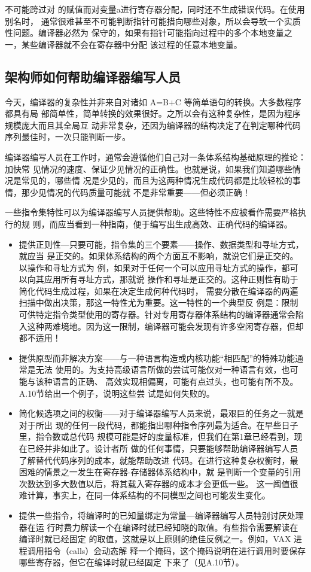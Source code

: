 不可能跨过对 的赋值而对变量a进行寄存器分配，同时还不生成错误代码。在使用别名时，
通常很难甚至不可能判断指针可能措向哪些对象，所以会导致一个实质性问题。编译器必然为
保守的，如果有指针可能指向过程中的多个本地变量之一，某些编译器就不会在寄存器中分配
该过程的任意本地变量。

\subsection{架构师如何帮助编译器编写人员}

今天，编译器的复杂性并非来自对诸如 A=B+C 等简单语句的转换。大多数程序都具有局
部简单性，简单转换的效果很好。之所以会有这种复杂性，是因为程序规模庞大而且其全局互
动非常复杂，还因为编译器的结构决定了在判定哪种代码序列最佳时，一次只能判断一步。

编译器编写人员在工作时，通常会遵循他们自己对一条体系结构基础原理的推论：加快常
见情况的速度、保证少见情况的正确性。也就是说，如果我们知道哪些情况是常见的，哪些情
况是少见的，而且为这两种情况生成代码都是比较轻松的事情，那少见情况的代码质量可能就
不是非常重要——但必须正确！

一些指令集特性可以为编译器编写人员提供帮助。这些特性不应被看作需要严格执行的规
则，而应当看到一种指南，便于编写出生成高效、正确代码的编译器。
\begin{itemize}
    \item 提供正则性—只要可能，指令集的三个要素——操作、数据类型和寻址方式，就应当
    是正交的。如果体系结构的两个方面互不影响，就说它们是正交的。以操作和寻址方式为
    例，如果对于任何一个可以应用寻址方式的操作，都可以向其应用所有寻址方式，那就说
    操作和寻址是正交的。这种正则性有助于简化代码生成过程，如果在决定生成何种代码时，
    需要分散在编译器的两遍扫描中做出决策，那这一特性尤为重要。这一特性的一个典型反
    例是：限制可供特定指令类型使用的寄存器。针对专用寄存器体系结构的编译器通常会陷
    入这种两难境地。因为这一限制，编译器可能会发现有许多空闲寄存器，但却都不适用！
    \item 提供原型而非解决方案——与一种语言构造或内核功能“相匹配”的特殊功能通常是无法
    使用的。为支持高级语言所做的尝试可能仅对一种语言有效，也可能与该种语言的正确、
    高效实现相偏离，可能有点过头，也可能有所不及。A.10节给出一个例子，说明这些尝
    试是如何失败的。
    \item 简化候选项之间的权衡——对于编译器编写人员来说，最艰巨的任务之一就是对于所出
    现的任何一段代码，都能指出哪种指令序列最为适合。在早些日子里，指令数或总代码
    规模可能是好的度量标准，但我们在第1章已经看到，现在已经并非如此了。设计者所
    做的任何事情，只要能够帮助编译器编写人员了解替代代码序列的成本，就能帮助改进
    代码。在进行这种复杂权衡时，最困难的情景之一发生在寄存器-存储器体系结构中，就
    是判断一个变量的引用次数达到多大数值以后，将其载入寄存器的成本才会更低一些。
    这一阈值很难计算，事实上，在同一体系结构的不同模型之间也可能发生变化。
    \item 提供一些指令，将编译时的已知量绑定为常量—编译器编写人员特别讨厌处理器在运
    行时费力解读一个在编译时就已经知晓的取值。有些指令需要解读在编译时就已经固定
    的取值，这就是以上原则的绝佳反例之一。例如，VAX 进程调用指令（calls）会动态解
    释一个掩码，这个掩码说明在进行调用时要保存哪些寄存器，但它在编译时就已经固定
    下来了（见A.10节）。
\end{itemize}


